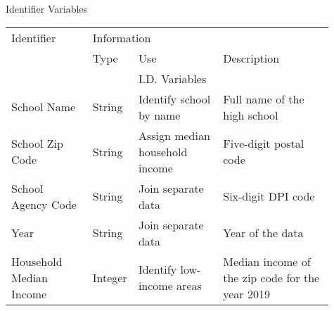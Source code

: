 \begin{threeparttable}
    \caption{Identifier Variables} %
\label{tab:idvariables} %
    \begin{tabular}{ p{0.25\linewidth} p{0.06\linewidth} p{0.26\linewidth} p{0.34\linewidth}}     %
    \toprule %
    Identifier                        & \multicolumn{3}{l}{Information} \\ %

                       \cmidrule(r){2-4} %
                                    &    Type   &   Use                           &  Description                                    \\ 
\midrule
                                    &            &  I.D. Variables                 &                                                 \\ 
School Name                         &    String  &  Identify school by name        & Full name of the high school                    \\
School Zip Code                     &    String  &  Assign median household income & Five-digit postal code                          \\
School Agency Code                  &    String  &  Join separate data             & Six-digit DPI code                              \\
Year                                &    String  &  Join separate data             & Year of the data                                \\
Household Median Income             &    Integer &  Identify low-income areas      & Median income of the zip code for the year 2019 \\
\midrule
\end{tabular}
\end{threeparttable}